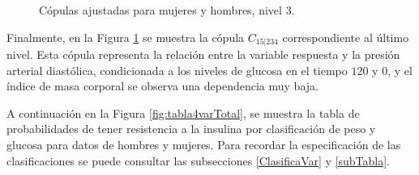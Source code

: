 \begin{figure}[H]
 \centering
    \caption{Cópulas ajustadas para mujeres y hombres, nivel $3$.}
    \label{fig:Modelo4TotalNivel4}
\end{figure}

Finalmente, en la Figura \ref{fig:Modelo4TotalNivel4} se muestra la cópula $C_{15|234}$ correspondiente al último nivel. Esta cópula representa la relación entre la variable respuesta y la presión arterial diastólica, condicionada a los niveles de glucosa en el tiempo $120$ y $0$, y el índice de masa corporal se observa una dependencia muy baja.

A continuación en la Figura \ref{fig:tabla4varTotal}, se muestra la tabla de probabilidades de tener resistencia a la insulina por clasificación de peso y glucosa para datos de hombres y mujeres. Para recordar la especificación de las clasificaciones se puede consultar las subsecciones \ref{ClasificaVar} y \ref{subTabla}.



